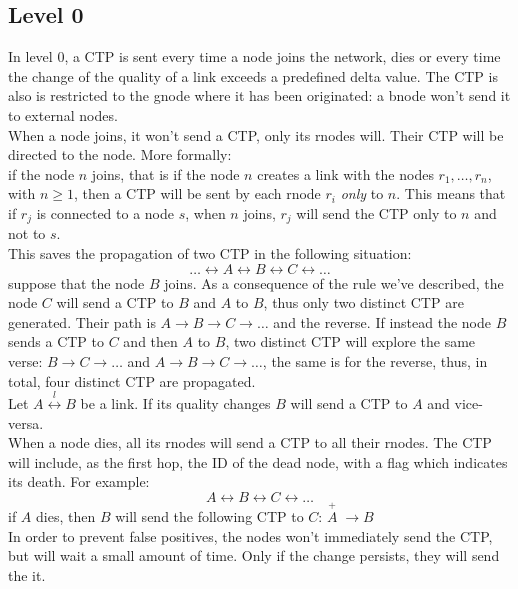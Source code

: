 \documentclass[a4paper]{article}
\begin{document}
\subsection{Level 0}
\label{sec:netdyn-level0}
In level 0, a CTP is sent every time a node joins the network, dies or every
time the change of the quality of a link exceeds a predefined delta value. The
CTP is also is restricted to the gnode where it has been originated: a
bnode won't send it to external nodes.\\
\newline
When a node joins, it won't send a CTP, only its rnodes will.
Their CTP will be directed to the node. More formally:\\
if the node $n$ joins, that is if the node $n$ creates a link
with the nodes $r_1,\dots,r_n$, with $n\ge 1$, then a CTP will
be sent by each rnode $r_i$ \emph{only} to $n$. This means that if $r_j$ is connected to a node $s$, when
$n$ joins, $r_j$ will send the CTP only to $n$ and not to
$s$.\\
This saves the propagation of two CTP in the following situation:
\[\dots \leftrightarrow A\leftrightarrow B\leftrightarrow C\leftrightarrow\dots\]
suppose that the node $B$ joins. As a consequence of the rule we've described,
the node $C$ will send a CTP to $B$ and $A$ to $B$, thus only two distinct CTP are
generated. Their path is $A\rightarrow B\rightarrow C\rightarrow \dots$ and
the reverse. If instead the node $B$ sends a CTP to $C$ and then $A$ to $B$,
two distinct CTP will explore the same verse: $B\rightarrow
C\rightarrow\dots $ and $A\rightarrow B\rightarrow C\rightarrow \dots$, the
same is for the reverse, thus, in total, four distinct CTP are propagated.\\
\newline
Let $A\stackrel{l}{\leftrightarrow}B$ be a link. If its quality changes $B$
will send a CTP to $A$ and vice-versa.\\
\newline
When a node dies, all its rnodes will send a CTP to all their rnodes. The CTP
will include, as the first hop, the ID of the dead node, with a flag which
indicates its death. For example:
\[A\leftrightarrow B\leftrightarrow C\leftrightarrow\dots\]
if $A$ dies, then $B$ will send the following CTP to $C$:
$\stackrel{+}{A}\;\rightarrow B$\\
\newline
In order to prevent false positives, the nodes won't immediately send the CTP, but
will wait a small amount of time. Only if the change persists, they will send
the it.
\end{document}
